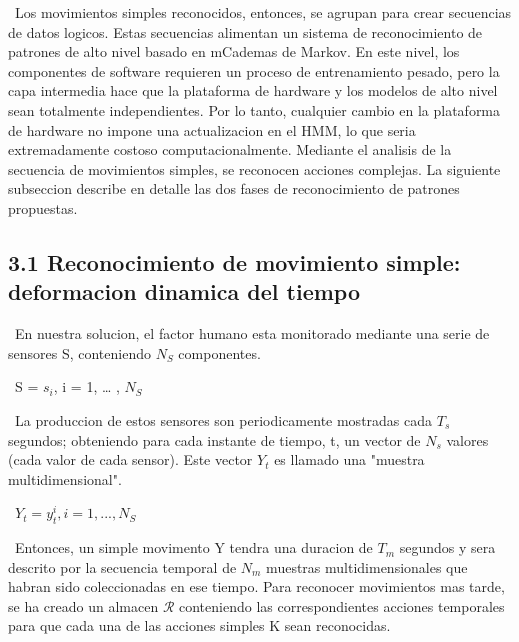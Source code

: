 \documentclass{paper}
\begin{document}
\ Los movimientos simples reconocidos, entonces, se agrupan para crear secuencias de datos logicos. Estas secuencias alimentan un sistema de reconocimiento de patrones de alto nivel basado en mCademas de Markov. En este nivel, los componentes de software requieren un proceso de entrenamiento pesado, pero la capa intermedia hace que la plataforma de hardware y los modelos de alto nivel sean totalmente independientes. Por lo tanto, cualquier cambio en la plataforma de hardware no impone una actualizacion en el HMM, lo que seria extremadamente costoso computacionalmente. Mediante el analisis de la secuencia de movimientos simples, se reconocen acciones complejas. La siguiente subseccion describe en detalle las dos fases de reconocimiento de patrones propuestas.



\subsection*{ 3.1 Reconocimiento de movimiento simple: deformacion dinamica del tiempo}



\ En nuestra solucion, el factor humano esta monitorado mediante una serie de sensores S, conteniendo $N_S$  componentes.

\ S = { $s_i$, i = 1, … , $N_S$ }

\ La produccion de estos sensores son periodicamente mostradas cada $T_s$ segundos; obteniendo para cada instante de tiempo, t, un vector de $N_s$ valores (cada valor de cada sensor). Este vector $Y_t$ es llamado una "muestra multidimensional".

\ $Y_t = {y_t^i , i = 1, ..., N_S}$

\ Entonces, un simple movimento Y tendra una duracion de $T_m$ segundos y sera descrito por la secuencia temporal de $N_m$ muestras multidimensionales que habran sido coleccionadas en ese tiempo. Para reconocer movimientos mas tarde, se ha creado un almacen $\mathcal{R}$ conteniendo las correspondientes acciones temporales para que cada una de las acciones simples K sean reconocidas.
\end{document}
